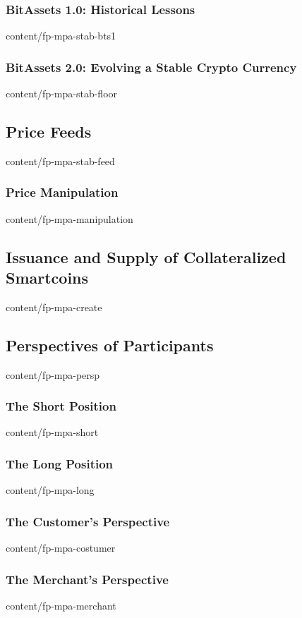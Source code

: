 \documentclass{btswhitepaper}
\begin{document}
\subsubsection  { BitAssets 1.0: Historical Lessons                }  { content/fp-mpa-stab-bts1       } 
\subsubsection  { BitAssets 2.0: Evolving a Stable Crypto Currency }  { content/fp-mpa-stab-floor      } 
\subsection     { Price Feeds                                      }  { content/fp-mpa-stab-feed       } 
\subsubsection  { Price Manipulation                               }  { content/fp-mpa-manipulation    } 
\subsection     { Issuance and Supply of Collateralized Smartcoins }  { content/fp-mpa-create          } 
\subsection     { Perspectives of Participants                     }  { content/fp-mpa-persp           } 
\subsubsection  { The Short Position                               }  { content/fp-mpa-short           } 
\subsubsection  { The Long Position                                }  { content/fp-mpa-long            } 
\subsubsection  { The Customer's Perspective                       }  { content/fp-mpa-costumer        } 
\subsubsection  { The Merchant's Perspective                       }  { content/fp-mpa-merchant        } 
\end{document}
